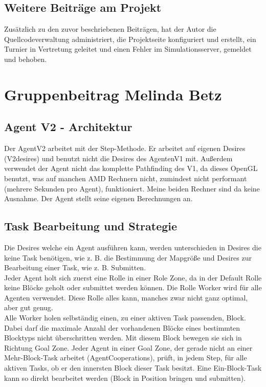 \documentclass[runningheads]{llncs}
\begin{document}
\subsection{Weitere Beiträge am Projekt}\label{weitereBeitraege}
Zusätzlich zu den zuvor beschriebenen Beiträgen, hat der Autor die Quellcodeverwaltung \cite{Github} administriert, die Projektseite \cite{Site} konfiguriert und erstellt, ein Turnier in Vertretung geleitet und einen Fehler im Simulationsserver, gemeldet \cite{Bug} und behoben.


\section{Gruppenbeitrag Melinda Betz}
\subsection{Agent V2 - Architektur}
Der AgentV2 arbeitet mit der Step-Methode. 
Er arbeitet auf eigenen Desires (V2desires) und benutzt nicht die Desires des AgentenV1 mit. Außerdem verwendet der Agent nicht das komplette Pathfinding des V1, da dieses OpenGL benutzt, was auf manchen AMD Rechnern nicht, zumindest nicht performant (mehrere Sekunden pro Agent), funktioniert. Meine beiden Rechner sind da keine Ausnahme. Der Agent stellt seine eigenen Berechnungen an. 
 

\subsection{Task Bearbeitung und Strategie}
Die Desires welche ein Agent ausführen kann, werden unterschieden in Desires die keine Task benötigen, wie z. B. die Bestimmung der Mapgröße und Desires zur Bearbeitung einer Task, wie z. B. Submitten.\\

Jeder Agent holt sich zuerst eine Rolle in einer Role Zone, da in der Default Rolle keine Blöcke geholt oder submittet werden können. Die Rolle Worker wird für alle Agenten verwendet. Diese Rolle alles kann, manches zwar nicht ganz optimal, aber gut genug.\\

Alle Worker holen selbständig einen, zu einer aktiven Task passenden, Block. Dabei darf die maximale Anzahl der vorhandenen Blöcke eines bestimmten Blocktyps nicht überschritten werden. Mit diesem Block bewegen sie sich in Richtung Goal Zone. 
Jeder Agent in einer Goal Zone, der gerade nicht an einer Mehr-Block-Task arbeitet (AgentCooperations), prüft, in jedem Step, für alle aktiven Tasks, ob er den innersten Block dieser Task besitzt. Eine Ein-Block-Task kann so direkt bearbeitet werden (Block in Position bringen und submitten). \\
\end{document}
